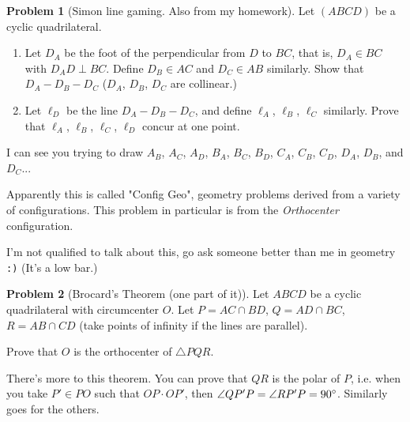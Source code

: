 \documentclass[11pt]{article} %
\theoremstyle{definition}
\newtheorem{problem}{Problem}
\theoremstyle{remark}
\begin{document}
\begin{problem}[Simon line gaming. Also from my homework]
    Let \((ABCD)\) be a cyclic quadrilateral.
    \begin{enumerate}[label=(\alph*)]
        \item Let \(D_A\) be the foot of the perpendicular from \(D\) to \(BC\), that is, \(D_A \in BC\) with \(D_AD \perp BC\). Define \(D_B \in AC\) and \(D_C \in AB\) similarly. Show that \(D_A - D_B - D_C\) (\(D_A\), \(D_B\), \(D_C\) are collinear.)
        \item Let \(\ell_D\) be the line \(D_A - D_B - D_C\), and define \(\ell_A\), \(\ell_B\), \(\ell_C\) similarly. Prove that \(\ell_A\), \(\ell_B\), \(\ell_C\), \(\ell_D\) concur at one point.
    \end{enumerate}
    \begin{talks}
        \begin{talk}
            I can see you trying to draw \(A_B\), \(A_C\), \(A_D\), \(B_A\), \(B_C\), \(B_D\), \(C_A\), \(C_B\), \(C_D\), \(D_A\), \(D_B\), and \(D_C\)...
        \end{talk}
        \begin{talk}
            Apparently this is called "Config Geo", geometry problems derived from a variety of configurations. This problem in particular is from the \emph{Orthocenter} configuration.

            I'm not qualified to talk about this, go ask someone better than me in geometry \texttt{:)} (It's a low bar.)
        \end{talk}
    \end{talks}
\end{problem}

\begin{problem}[Brocard's Theorem (one part of it)]
    Let \(ABCD\) be a cyclic quadrilateral with circumcenter \(O\). Let \(P = AC \cap BD\), \(Q = AD \cap BC\), \(R = AB \cap CD\) (take points of infinity if the lines are parallel).

    Prove that \(O\) is the orthocenter of \(\triangle PQR\).
    \begin{talks}
        \begin{talk}
            There's more to this theorem. You can prove that \(QR\) is the polar of \(P\), i.e. when you take \(P' \in PO\) such that \(OP \cdot OP'\), then \(\angle QP'P = \angle RP'P = 90 \degree\). Similarly goes for the others.
        \end{talk}
    \end{talks}
\end{problem}
\end{document}
